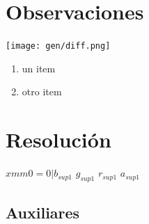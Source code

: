 \documentclass[10pt,a4paper,spanish]{article}
\begin{document}
	
	


\section{Observaciones}
	\texttt{[image: gen/diff.png]}
	\begin{enumerate}
		\item un item
		\item otro item
	\end{enumerate}

\section{Resolución}

\vspace*{0.3cm}
$xmm0=  0|b_{sup1}$ $g_{sup1}$ $r_{sup1}$ $a_{sup1}$ 


\subsection{Auxiliares}
\end{document}
